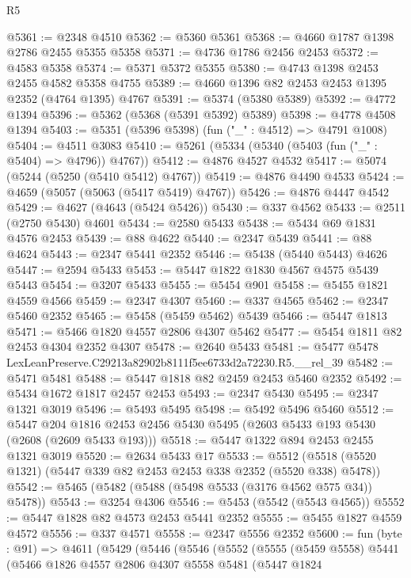 \begin{lexlean}{R5}
\begin{coremodule}
@5361 := @2348 @4510
@5362 := @5360 @5361
@5368 := @4660 @1787 @1398 @2786 @2455 @5355 @5358
@5371 := @4736 @1786 @2456 @2453
@5372 := @4583 @5358
@5374 := @5371 @5372 @5355
@5380 := @4743 @1398 @2453 @2455 @4582 @5358 @4755
@5389 := @4660 @1396 @82 @2453 @2453 @1395 @2352 (@4764 @1395) @4767
@5391 := @5374 (@5380 @5389)
@5392 := @4772 @1394
@5396 := @5362 (@5368 (@5391 @5392) @5389)
@5398 := @4778 @4508 @1394
@5403 := @5351 (@5396 @5398) (fun ("_" : @4512) => @4791 @1008)
@5404 := @4511 @3083
@5410 := @5261 (@5334 (@5340 (@5403 (fun ("_" : @5404) => @4796)) @4767))
@5412 := @4876 @4527 @4532
@5417 := @5074 (@5244 (@5250 (@5410 @5412) @4767))
@5419 := @4876 @4490 @4533
@5424 := @4659 (@5057 (@5063 (@5417 @5419) @4767))
@5426 := @4876 @4447 @4542
@5429 := @4627 (@4643 (@5424 @5426))
@5430 := @337 @4562
@5433 := @2511 (@2750 @5430) @4601
@5434 := @2580 @5433
@5438 := @5434 @69 @1831 @4576 @2453
@5439 := @88 @4622
@5440 := @2347 @5439
@5441 := @88 @4624
@5443 := @2347 @5441 @2352
@5446 := @5438 (@5440 @5443) @4626
@5447 := @2594 @5433
@5453 := @5447 @1822 @1830 @4567 @4575 @5439 @5443
@5454 := @3207 @5433
@5455 := @5454 @901
@5458 := @5455 @1821 @4559 @4566
@5459 := @2347 @4307
@5460 := @337 @4565
@5462 := @2347 @5460 @2352
@5465 := @5458 (@5459 @5462) @5439
@5466 := @5447 @1813
@5471 := @5466 @1820 @4557 @2806 @4307 @5462
@5477 := @5454 @1811 @82 @2453 @4304 @2352 @4307
@5478 := @2640 @5433
@5481 := @5477 @5478 LexLeanPreserve.C29213a82902b8111f5ee6733d2a72230.R5.__rel_39
@5482 := @5471 @5481
@5488 := @5447 @1818 @82 @2459 @2453 @5460 @2352
@5492 := @5434 @1672 @1817 @2457 @2453
@5493 := @2347 @5430
@5495 := @2347 @1321 @3019
@5496 := @5493 @5495
@5498 := @5492 @5496 @5460
@5512 := @5447
    @204
    @1816
    @2453
    @2456
    @5430
    @5495
    (@2603 @5433 @193 @5430 (@2608 (@2609 @5433 @193)))
@5518 := @5447 @1322 @894 @2453 @2455 @1321 @3019
@5520 := @2634 @5433 @17
@5533 := @5512 (@5518 (@5520 @1321) (@5447 @339 @82 @2453 @2453 @338 @2352 (@5520 @338) @5478))
@5542 := @5465 (@5482 (@5488 (@5498 @5533 (@3176 @4562 @575 @34)) @5478))
@5543 := @3254 @4306
@5546 := @5453 (@5542 (@5543 @4565))
@5552 := @5447 @1828 @82 @4573 @2453 @5441 @2352
@5555 := @5455 @1827 @4559 @4572
@5556 := @337 @4571
@5558 := @2347 @5556 @2352
@5600 := fun (byte : @91) =>
  @4611
    (@5429
      (@5446
        (@5546
          (@5552
            (@5555
              (@5459 @5558)
              @5441
              (@5466
                @1826
                @4557
                @2806
                @4307
                @5558
                @5481
                (@5447
                  @1824

\end{coremodule}
\end{lexlean}
